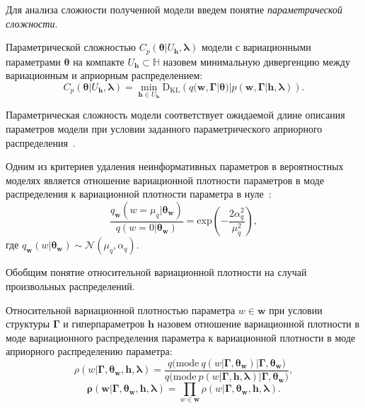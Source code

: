 Для анализа сложности полученной модели введем понятие \textit{параметрической сложности}. 
\begin{defin} 
Параметрической сложностью  $C_p(\boldsymbol{\theta}|U_\mathbf{h},\boldsymbol{\lambda})$ модели с вариационными параметрами $\boldsymbol{\theta}$ на компакте $U_\mathbf{h} \subset \mathbb{H}$ назовем минимальную дивергенцию между вариационным и априорным распределением:
\[
C_p(\boldsymbol{\theta}|U_\mathbf{h},\boldsymbol{\lambda}) = \min_{\mathbf{h} \in U_\mathbf{h}} \text{D}_\text{KL}\left(q(\mathbf{w}, \boldsymbol{\Gamma}|\boldsymbol{\theta})|p(\mathbf{w}, \boldsymbol{\Gamma}|\mathbf{h},\boldsymbol{\lambda})\right).
\]
\end{defin}
Параметрическая сложность модели соответствует ожидаемой длине описания параметров модели при условии заданного параметрического априорного распределения~\cite{hinton_mdl}.

Одним из критериев удаления неинформативных параметров в вероятностных моделях является отношение вариационной плотности параметров в моде распределения к вариационной плотности параметра в нуле~\cite{nips}:
\[
    \frac{q_\mathbf{w}(w = \mu_q|\boldsymbol{\theta}_\mathbf{w})}{q(w = 0|\boldsymbol{\theta}_\mathbf{w})} = \text{exp}\left(-\frac{2\alpha_q^2}{\mu_q^2}\right),
\]
где $q_\mathbf{w}(w|\boldsymbol{\theta}_\mathbf{w}) \sim \mathcal{N}(\mu_q, \alpha_q).$

Обобщим понятие относительной вариационной плотности на случай произвольных распределений.
\begin{defin}
Относительной вариационной   плотностью параметра $w \in \mathbf{w}$  при условии структуры $\boldsymbol{\Gamma}$ и гиперпараметров $\mathbf{h}$ назовем отношение вариационной плотности в моде вариационного распределения параметра к вариационной плотности в моде априорного распределению параметра:
\[
    \rho(w|\boldsymbol{\Gamma}, \boldsymbol{\theta}_\mathbf{w}, \mathbf{h},\boldsymbol{\lambda}) = \frac{q\bigl(\text{mode}~q\left(w|\boldsymbol{\Gamma}, \boldsymbol{\theta}_\mathbf{w}\right)|\boldsymbol{\Gamma}, \boldsymbol{\theta}_\mathbf{w}\bigr)}{q\bigl(\text{mode}~p\left({w}|\boldsymbol{\Gamma}, \mathbf{h},\boldsymbol{\lambda}\right)|\boldsymbol{\Gamma},\boldsymbol{\theta}_\mathbf{w}\bigr)},
\]
\[
    \boldsymbol{\rho}(\mathbf{w}|\boldsymbol{\Gamma}, \boldsymbol{\theta}_\mathbf{w}, \mathbf{h},\boldsymbol{\lambda}) = \prod_{w \in \mathbf{w}}\rho(w|\boldsymbol{\Gamma}, \boldsymbol{\theta}_\mathbf{w}, \mathbf{h},\boldsymbol{\lambda}).
\]

\end{defin}


